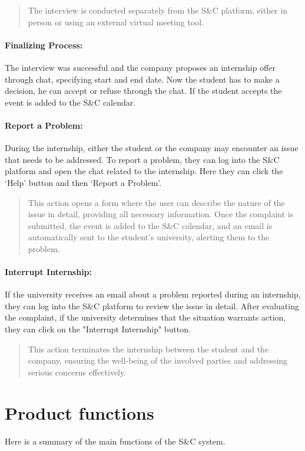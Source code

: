 \begin{quote}
The interview is conducted separately from the S\&C platform, either in
person or using an external virtual meeting tool.~
\end{quote}

\paragraph{Finalizing Process:} The interview was successful and the
  company proposes an internship offer through chat, specifying start
  and end date. Now the student has to make a decision, he can accept or
  refuse through the chat. If the student accepts the event is added to
  the S\&C calendar.~~

\paragraph{Report a Problem:} During the internship, either the student
  or the company may encounter an issue that needs to be addressed. To
  report a problem, they can log into the S\&C platform and open the
  chat related to the internship. Here they can click the `Help' button
  and then `Report a Problem'.

\begin{quote}
This action opens a form where the user can describe the nature of the
issue in detail, providing all necessary information. Once the complaint
is submitted, the event is added to the S\&C calendar, and an email is
automatically sent to the student's university, alerting them to the
problem.
\end{quote}

\paragraph{Interrupt Internship:} If the university receives an email
  about a problem reported during an internship, they can log into the
  S\&C platform to review the issue in detail. After evaluating the
  complaint, if the university determines that the situation warrants
  action, they can click on the "Interrupt Internship" button.

\begin{quote}
This action terminates the internship between the student and the
company, ensuring the well-being of the involved parties and addressing
serious concerns effectively.
\end{quote}

\section{Product functions}
\label{sec:product_functions}%
Here is a summary of the main functions of the S\&C system.

